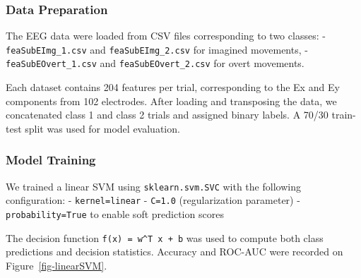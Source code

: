 \documentclass[
  letterpaper,
  DIV=11,
  numbers=noendperiod]{scrartcl}
\begin{document}
\subsubsection{Data Preparation}\label{data-preparation}

The EEG data were loaded from CSV files corresponding to two classes: -
\texttt{feaSubEImg\_1.csv} and \texttt{feaSubEImg\_2.csv} for imagined
movements, - \texttt{feaSubEOvert\_1.csv} and
\texttt{feaSubEOvert\_2.csv} for overt movements.

Each dataset contains 204 features per trial, corresponding to the Ex
and Ey components from 102 electrodes. After loading and transposing the
data, we concatenated class 1 and class 2 trials and assigned binary
labels. A 70/30 train-test split was used for model evaluation.

\subsubsection{Model Training}\label{model-training}

We trained a linear SVM using \texttt{sklearn.svm.SVC} with the
following configuration: -
\texttt{kernel=\textquotesingle{}linear\textquotesingle{}} -
\texttt{C=1.0} (regularization parameter) - \texttt{probability=True} to
enable soft prediction scores

The decision function \texttt{f(x)\ =\ w\^{}T\ x\ +\ b} was used to
compute both class predictions and decision statistics. Accuracy and
ROC-AUC were recorded on Figure~\ref{fig-linearSVM}.
\end{document}
